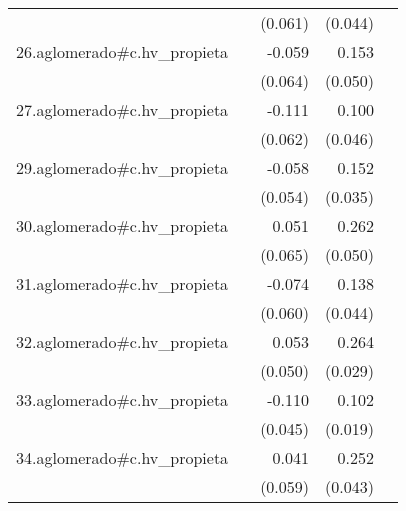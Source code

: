 {\begin{longtable}{l*{4}{D{.}{.}{-1}}}
            &                     &     (0.061)         &     (0.044)         &                     \\
\addlinespace
26.aglomerado#c.hv\_propieta&                     &      -0.059         &       0.153\sym{**} &                     \\
            &                     &     (0.064)         &     (0.050)         &                     \\
\addlinespace
27.aglomerado#c.hv\_propieta&                     &      -0.111         &       0.100\sym{*}  &                     \\
            &                     &     (0.062)         &     (0.046)         &                     \\
\addlinespace
29.aglomerado#c.hv\_propieta&                     &      -0.058         &       0.152\sym{***}&                     \\
            &                     &     (0.054)         &     (0.035)         &                     \\
\addlinespace
30.aglomerado#c.hv\_propieta&                     &       0.051         &       0.262\sym{***}&                     \\
            &                     &     (0.065)         &     (0.050)         &                     \\
\addlinespace
31.aglomerado#c.hv\_propieta&                     &      -0.074         &       0.138\sym{**} &                     \\
            &                     &     (0.060)         &     (0.044)         &                     \\
\addlinespace
32.aglomerado#c.hv\_propieta&                     &       0.053         &       0.264\sym{***}&                     \\
            &                     &     (0.050)         &     (0.029)         &                     \\
\addlinespace
33.aglomerado#c.hv\_propieta&                     &      -0.110\sym{*}  &       0.102\sym{***}&                     \\
            &                     &     (0.045)         &     (0.019)         &                     \\
\addlinespace
34.aglomerado#c.hv\_propieta&                     &       0.041         &       0.252\sym{***}&                     \\
            &                     &     (0.059)         &     (0.043)         &                     \\

\end{longtable}}
